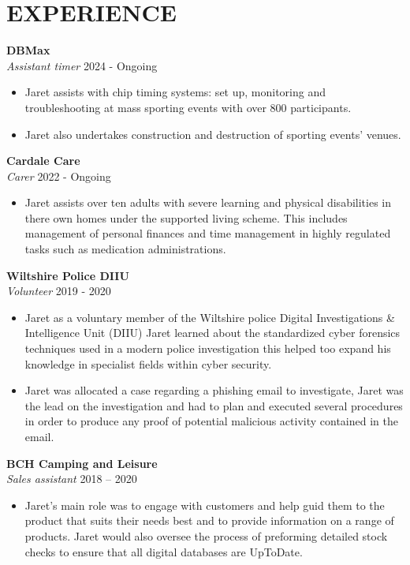 \section*{EXPERIENCE}

\noindent
\textbf{DBMax}\\
\textit{Assistant timer} \hfill 2024 - Ongoing
\begin{itemize}
    \item Jaret assists with chip timing systems: set up, monitoring and troubleshooting at mass sporting events with over 800 participants.
    \item Jaret also undertakes construction and destruction of sporting events' venues.
\end{itemize}

\noindent
\textbf{Cardale Care}\\
\textit{Carer} \hfill 2022 - Ongoing
\begin{itemize}
    \item Jaret assists over ten adults with severe learning and physical disabilities in there own homes under the supported living scheme. This includes management of personal finances and time management in highly regulated tasks such as medication administrations.
\end{itemize}

\noindent
\textbf{Wiltshire Police DIIU}\\
\textit{Volunteer} \hfill 2019 - 2020 
\begin{itemize}
    \item Jaret as a voluntary member of the Wiltshire police Digital Investigations \& Intelligence Unit (DIIU) Jaret learned about the standardized cyber forensics techniques used in a modern police investigation this helped too expand his knowledge in specialist fields within cyber security.
    \item Jaret was allocated a case regarding a phishing email to investigate, Jaret was the lead on the investigation and had to plan and executed several procedures in order to produce any proof of potential malicious activity contained in the email.
\end{itemize}

\noindent
\textbf{BCH Camping and Leisure}\\
\textit{Sales assistant} \hfill 2018 – 2020
\begin{itemize}
    \item Jaret’s main role was to engage with customers and help guid them to the product that suits their needs best and to provide information on a range of products. Jaret would also oversee the process of preforming detailed stock checks to ensure that all digital databases are UpToDate. 
\end{itemize}


